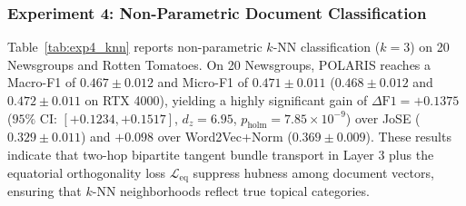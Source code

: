 \documentclass[journal]{IEEEtran}
\begin{document}
\begin{table}[!t]
\centering
\caption{Experiment 4 (Part A): Non-Parametric $k$-NN Document Classification ($k=3$) on 20 Newsgroups and Rotten Tomatoes Across 10 Seeds (Mean $\pm$ SD, Tesla T4).}
\label{tab:exp4_knn}
\end{table}

\subsubsection{Experiment 4: Non-Parametric Document Classification}
Table~\ref{tab:exp4_knn} reports non-parametric $k$-NN classification ($k=3$) on 20 Newsgroups and Rotten Tomatoes. On 20 Newsgroups, POLARIS reaches a Macro-F1 of $0.467 \pm 0.012$ and Micro-F1 of $0.471 \pm 0.011$ ($0.468 \pm 0.012$ and $0.472 \pm 0.011$ on RTX 4000), yielding a highly significant gain of $\Delta\text{F1} = +0.1375$ ($95\%$ CI: $[+0.1234, +0.1517]$, $d_z = 6.95$, $p_{\text{holm}} = 7.85 \times 10^{-9}$) over JoSE ($0.329 \pm 0.011$) and $+0.098$ over Word2Vec+Norm ($0.369 \pm 0.009$). These results indicate that two-hop bipartite tangent bundle transport in Layer 3 plus the equatorial orthogonality loss $\mathcal{L}_{\text{eq}}$ suppress hubness among document vectors, ensuring that $k$-NN neighborhoods reflect true topical categories.
\end{document}
